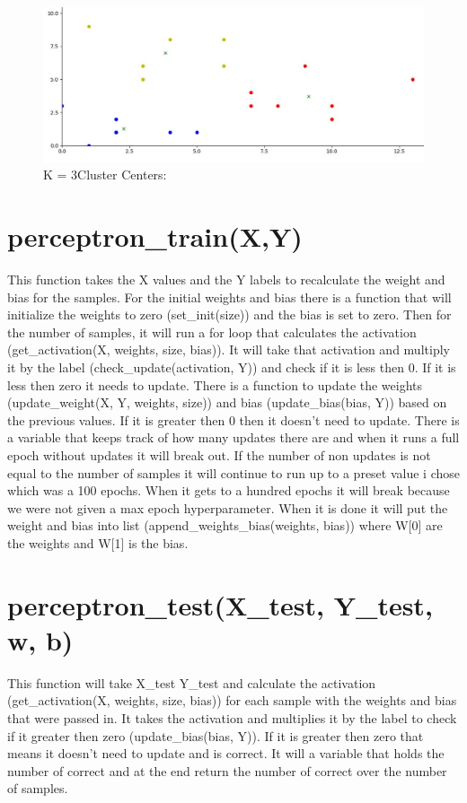 \documentclass{article}
\begin{document}
\begin{figure}[h!]
\centering
\includegraphics[scale=.5]{cluster_k3}
\caption{K = 3\newline Cluster Centers: \newline[9.142857142857142, 3.7142857142857144]\newline[2.2857142857142856, 1.2857142857142858]\newline[3.8333333333333335, 7.0]}
\end{figure}


\clearpage
\section {perceptron\_train(X,Y)}
This function takes the X values and the Y labels to recalculate the weight and bias for the samples. 
For the initial weights and bias there is a function that will initialize the weights to zero (set\_init(size)) and the bias is set to zero. Then for the number of samples, it will run a for loop that calculates the activation (get\_activation(X, weights, size, bias)). It will take that activation and multiply it by the label (check\_update(activation, Y)) and check if it is less then 0. If it is less then zero it needs to update. There is a function to update the weights (update\_weight(X, Y, weights, size)) and bias (update\_bias(bias, Y)) based on the previous values. If it is greater then 0 then it doesn't need to update. There is a variable that keeps track of how many updates there are and when it runs a full epoch without updates it will break out. If the number of non updates is not equal to the number of samples it will continue to run up to a preset value i chose which was a 100 epochs. When it gets to a hundred epochs it will break because we were not given a max epoch hyperparameter. When it is done it will put the weight and bias into list (append\_weights\_bias(weights, bias)) where W[0] are the weights and W[1] is the bias.

\section {perceptron\_test(X\_test, Y\_test, w, b)}
This function will take X\_test Y\_test and calculate the activation (get\_activation(X, weights, size, bias)) for each sample with the weights and bias that were passed in. It takes the activation and multiplies it by the label to check if it greater then zero (update\_bias(bias, Y)). If it is greater then zero that means it doesn't need to update and is correct. It will a variable that holds the number of correct and at the end return the number of correct over the number of samples. 
\end{document}
